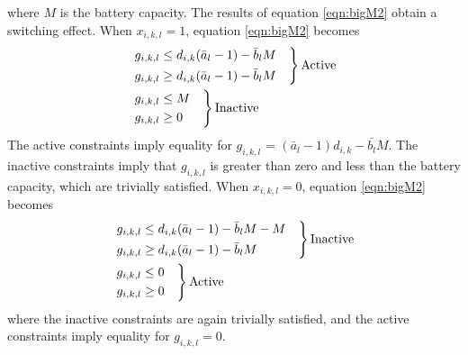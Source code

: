 where $M$ is the battery capacity. The results of equation \ref{eqn:bigM2} obtain a switching effect.  When $x_{i,k,l} = 1$, equation \ref{eqn:bigM2} becomes 
\begin{equation}
	\begin{aligned}
		& \begin{rcases}
			g_{i,k,l} \le d_{i,k}(\bar{a}_l - 1) - \bar{b}_lM & \\
			g_{i,k,l} \ge d_{i,k}(\bar{a}_l - 1) - \bar{b}_lM & \\
		\end{rcases} \text{Active}\\ 
		& \begin{drcases}
			g_{i,k,l} \le M & \\
			g_{i,k,l} \ge 0 & \\ 
		\end{drcases} \text{Inactive} \\
	\end{aligned}
\end{equation}
The active constraints imply equality for $g_{i,k,l}$ = $(\bar{a}_l - 1)d_{i,k} - \bar{b_l}M$.  The inactive constraints imply that $g_{i,k,l}$ is greater than zero and less than the battery capacity, which are trivially satisfied. When $x_{i,k,l} = 0$, equation \ref{eqn:bigM2} becomes
\begin{equation}
	\begin{aligned}
		& \begin{rcases}
			g_{i,k,l} \le d_{i,k}(\bar{a}_l - 1) - \bar{b}_lM - M &\\
			g_{i,k,l} \ge d_{i,k}(\bar{a}_l - 1) - \bar{b}_lM &\\
		\end{rcases} \text{Inactive} \\
		& \begin{rcases}
			g_{i,k,l}\le 0 & \\
			g_{i,k,l}\ge 0 & \\ 
		\end{rcases}\text{Active}\\
	\end{aligned}
\end{equation}
where the inactive constraints are again trivially satisfied, and the
active constraints imply equality for $g_{i,k,l} = 0$.

